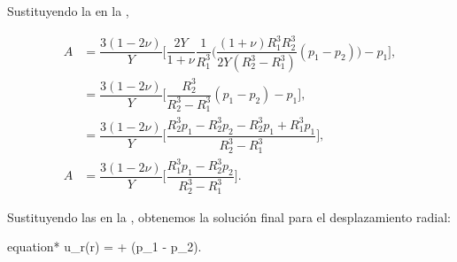 \documentclass[../main.tex]{subfiles}
\begin{document}
\begin{problema}[4]
	Sustituyendo la  en la ,

	\begin{align}
		A & = \dfrac{3(1 - 2\nu)}{Y}\Biggl[\dfrac{2Y}{1 + \nu}\dfrac{1}{R_{1}^{3}}\Biggl(\dfrac{(1 + \nu)R_{1}^{3}R_{2}^{3}}{2Y(R_{2}^{3} - R_{1}^{3})}(p_{1} - p_{2})\Biggr) - p_{1}\Biggr],\nonumber \\
		  & = \dfrac{3(1 - 2\nu)}{Y}\Biggl[\dfrac{R_{2}^{3}}{R_{2}^{3} - R_{1}^{3}}(p_{1} - p_{2}) - p_{1}\Biggr],\nonumber                                                                            \\
		  & = \dfrac{3(1 - 2\nu)}{Y}\Biggl[\dfrac{R_{2}^{3}p_{1} - R_{2}^{3}p_{2} - R_{2}^{3}p_{1} + R_{1}^{3}p_{1}}{R_{2}^{3} - R_{1}^{3}}\Biggr],\nonumber                                           \\
		A & = \dfrac{3(1 - 2\nu)}{Y}\Biggl[\dfrac{R_{1}^{3}p_{1} - R_{2}^{3}p_{2}}{R_{2}^{3} - R_{1}^{3}}\Biggr].\label{eq:coeff-A-final}
	\end{align}

	Sustituyendo las  en la , obtenemos la solución final para el desplazamiento radial:

	\begin{empheq}[box = \mainresult]{equation*}
		u_{r}(r) =  + (p_{1} - p_{2}).
	\end{empheq}

\end{problema}
\end{document}
